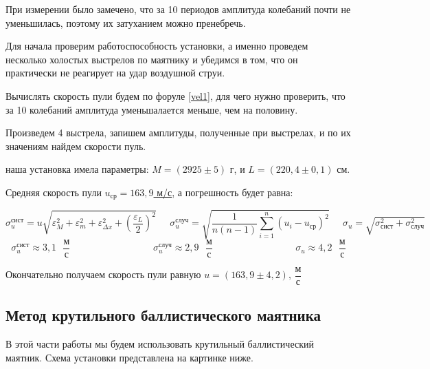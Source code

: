 \begin{center}
	При измерении было замечено, что за 10 периодов амплитуда колебаний почти не уменьшилась, поэтому их затуханием можно пренебречь.
	
	Для начала проверим работоспособность установки, а именно проведем несколько холостых выстрелов по маятнику и убедимся в том, что он практически не реагирует на удар воздушной струи.
	
	Вычислять скорость пули будем по форуле \eqref{vel1}, для чего нужно проверить, что за 10 колебаний амплитуда уменьшалается меньше, чем на половину.
	
	Произведем 4 выстрела, запишем амплитуды, полученные при выстрелах, и по их значениям найдем скорости пуль.
	

	
	\noindent наша установка имела параметры: $M = (2925 \pm 5)$ г, и $L = (220,4 \pm 0,1)$ см.
	
	Средняя скорость пули \underline{$u_\text{ср} = 163,9$ м/с}, а погрешность будет равна:
	
	\begin{equation}
		\sigma_u^{\text{сист}} =u \sqrt{\varepsilon_M^2 + \varepsilon_m^2 + \varepsilon_{\Delta x}^2 + \left(\frac{\varepsilon_L}{2} \right)^2}  \;\;\;\;\; \sigma_u^{\text{случ}} = \sqrt{ \frac{1}{n(n-1)} \sum_{i=1}^{n}(u_i - u_{\text{ср}})^2} \;\;\;\;\; \sigma_u =\sqrt{\sigma_{\text{сист}}^2 + \sigma_\text{случ}^2} 
	\end{equation}
	\begin{equation}
		\sigma_u^\text{сист}\approx 3,1 \text{ }\dfrac{\text{м}}{\text{с}} \;\;\;\;\;\;\;\;\;\;\;\;\;\;\;\;\;\;\;\;\;\;\;\;\;\;\;\;\;\;\; \sigma_u^\text{случ}\approx 2,9 \text{ }\dfrac{\text{м}}{\text{с}} \;\;\;\;\;\;\;\;\;\;\;\;\;\;\;\;\;\;\;\;\;\;\;\;\;\;\;\;\;\;\;
		\sigma_u \approx 4,2 \text{ }\dfrac{\text{м}}{\text{с}}
	\end{equation}
	
	Окончательно получаем скорость пули равную \underline{$u = (163,9 \pm 4,2)\text{, }\dfrac{\text{м}}{\text{с}}$}
	
	\subsection{Метод крутильного баллистического маятника}
	
	В этой части работы мы будем использовать крутильный баллистический маятник. Схема установки представлена на картинке ниже.
	

\end{center}
